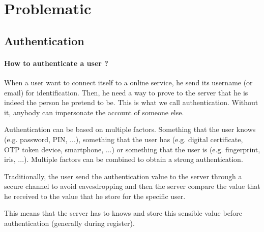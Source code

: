 \documentclass[../report.tex]{subfiles}
\begin{document}











\section{Problematic}
\subsection{Authentication}

\paragraph{How to authenticate a user ?}

When a user want to connect itself to a online service, he send its username (or email) for identification. Then, he need a way to prove to the server that he is indeed the person he pretend to be. This is what we call authentication. Without it, anybody can impersonate the account of someone else.

Authentication can be based on multiple factors. Something that the user knows (e.g. password, PIN, ...), something that the user has (e.g. digital certificate, OTP token device, smartphone, ...) or something that the user is (e.g. fingerprint, iris, ...). Multiple factors can be combined to obtain a strong authentication.

Traditionally, the user send the authentication value to the server through a secure channel to avoid eavesdropping and then the server compare the value that he received to the value that he store for the specific user.

This means that the server has to knows and store this sensible value before authentication (generally during register).
\end{document}
